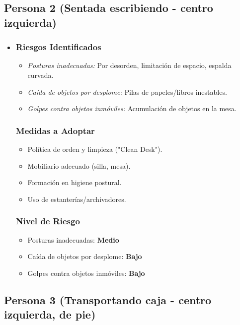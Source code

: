\documentclass[12pt,a4paper]{article}
\begin{document}
	\hrulefill
	
	\subsection{Persona 2 (Sentada escribiendo - centro izquierda)}
	\label{subsec:persona2} %
	
	\begin{itemize}
		\item \subsubsection{Riesgos Identificados}
		\begin{itemize}
			\item \textit{Posturas inadecuadas:} Por desorden, limitación de espacio, espalda curvada.
			\item \textit{Caída de objetos por desplome:} Pilas de papeles/libros inestables.
			\item \textit{Golpes contra objetos inmóviles:} Acumulación de objetos en la mesa.
		\end{itemize}
		\subsubsection{Medidas a Adoptar}
		\begin{itemize}
			\item Política de orden y limpieza ("Clean Desk").
			\item Mobiliario adecuado (silla, mesa).
			\item Formación en higiene postural.
			\item Uso de estanterías/archivadores.
		\end{itemize}
		\subsubsection{Nivel de Riesgo}
		\begin{itemize}
			\item Posturas inadecuadas: \textbf{Medio}
			\item Caída de objetos por desplome: \textbf{Bajo}
			\item Golpes contra objetos inmóviles: \textbf{Bajo}
		\end{itemize}
	\end{itemize}
	
	\hrulefill
	
	\subsection{Persona 3 (Transportando caja - centro izquierda, de pie)}
	\label{subsec:persona3} %
	
\end{document}
